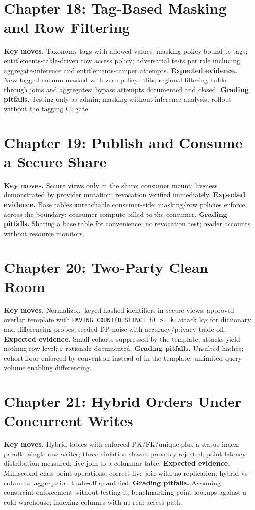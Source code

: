 \section{Chapter 18: Tag-Based Masking and Row Filtering}
\textbf{Key moves.} Taxonomy tags with allowed values; masking policy bound to tags; entitlements-table-driven row access policy; adversarial tests per role including aggregate-inference and entitlements-tamper attempts.
\textbf{Expected evidence.} New tagged column masked with zero policy edits; regional filtering holds through joins and aggregates; bypass attempts documented and closed.
\textbf{Grading pitfalls.} Testing only as admin; masking without inference analysis; rollout without the tagging CI gate.

\section{Chapter 19: Publish and Consume a Secure Share}
\textbf{Key moves.} Secure views only in the share; consumer mount; liveness demonstrated by provider mutation; revocation verified immediately.
\textbf{Expected evidence.} Base tables unreachable consumer-side; masking/row policies enforce across the boundary; consumer compute billed to the consumer.
\textbf{Grading pitfalls.} Sharing a base table for convenience; no revocation test; reader accounts without resource monitors.

\section{Chapter 20: Two-Party Clean Room}
\textbf{Key moves.} Normalized, keyed-hashed identifiers in secure views; approved overlap template with \texttt{HAVING COUNT(DISTINCT h) >= k}; attack log for dictionary and differencing probes; seeded DP noise with accuracy/privacy trade-off.
\textbf{Expected evidence.} Small cohorts suppressed by the template; attacks yield nothing row-level; $\varepsilon$ rationale documented.
\textbf{Grading pitfalls.} Unsalted hashes; cohort floor enforced by convention instead of in the template; unlimited query volume enabling differencing.

\section{Chapter 21: Hybrid Orders Under Concurrent Writes}
\textbf{Key moves.} Hybrid tables with enforced PK/FK/unique plus a status index; parallel single-row writer; three violation classes provably rejected; point-latency distribution measured; live join to a columnar table.
\textbf{Expected evidence.} Millisecond-class point operations; correct live join with no replication; hybrid-vs-columnar aggregation trade-off quantified.
\textbf{Grading pitfalls.} Assuming constraint enforcement without testing it; benchmarking point lookups against a cold warehouse; indexing columns with no real access path.


